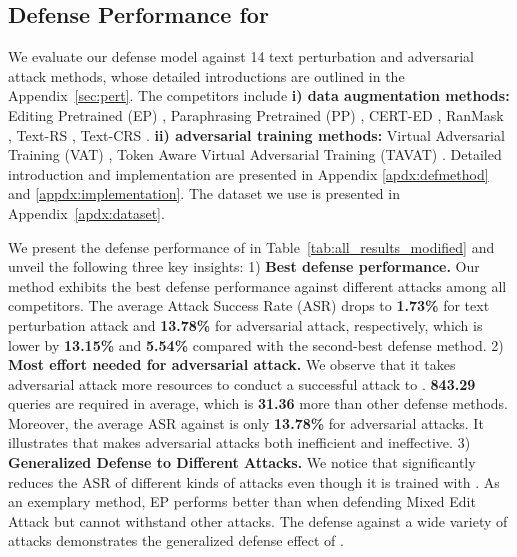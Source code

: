 \subsection{Defense Performance for }
We evaluate our defense model  against 14 text perturbation and adversarial attack methods, whose detailed introductions are outlined in the Appendix~\ref{sec:pert}. 
The competitors include \textbf{i) data augmentation methods:} Editing Pretrained (EP) \cite{wang2024comprehensive}, Paraphrasing Pretrained (PP) \cite{wang2024comprehensive}, CERT-ED \cite{huang2024cert}, RanMask \cite{zeng2023certified}, Text-RS \cite{zhang2024random}, Text-CRS \cite{zhang2024text}.
\textbf{ii) adversarial training methods:}
Virtual Adversarial Training (VAT) \cite{miyato2016virtual}, Token Aware Virtual Adversarial Training (TAVAT) \cite{li2021tavat}.
Detailed introduction and implementation are presented in Appendix \ref{apdx:defmethod} and \ref{appdx:implementation}. The dataset we use is presented in Appendix~\ref{apdx:dataset}.

We present the defense performance of  in Table~\ref{tab:all_results_modified} and unveil the following three key insights:
1) \textbf{Best defense performance.}
Our method exhibits the best defense performance against different attacks among all competitors.
The average Attack Success Rate (ASR) drops to \textbf{1.73\%} for text perturbation attack and \textbf{13.78\%} for adversarial attack, respectively, which is lower by \textbf{13.15\%} and \textbf{5.54\%} compared with the second-best defense method.
2) \textbf{Most effort needed for adversarial attack.}
We observe that it takes adversarial attack more resources to conduct a successful attack to .
\textbf{843.29} queries are required in average, which is \textbf{31.36} more than other defense methods.
Moreover, the average ASR against  is only \textbf{13.78\%} for adversarial attacks. 
It illustrates that  makes adversarial attacks both inefficient and ineffective.
3) \textbf{Generalized Defense to Different Attacks.}
We notice that  significantly reduces the ASR of different kinds of attacks even though it is trained with \attackname.
As an exemplary method, EP performs better than  when defending Mixed Edit Attack but cannot withstand other attacks.
The defense against a wide variety of attacks demonstrates the generalized defense effect of .
\vspace{-0.1cm}

